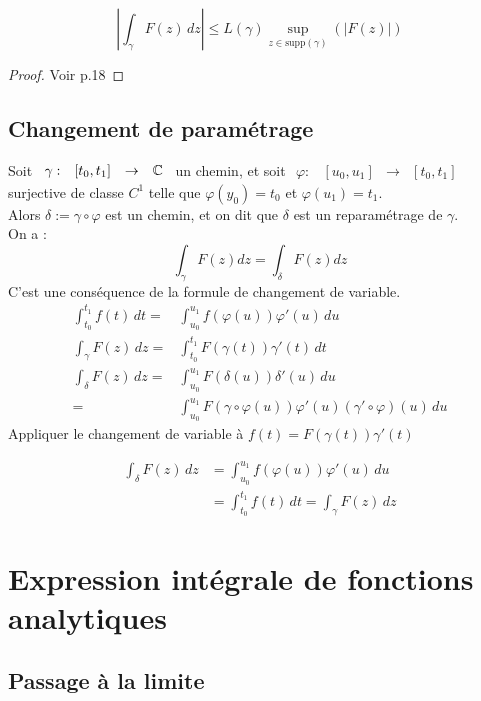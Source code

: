 \documentclass[]{report}
\begin{document}
\begin{lm}{}{}
    $$\left|\int_{\gamma} F(z) \,dz\right|\le L(\gamma)\underset{z\in\text{supp}(\gamma)}{\sup}(|F(z)|)$$
\end{lm}

\begin{proof}{}{}
    Voir p.18
\end{proof}

\subsection{Changement de paramétrage}

Soit $\begin{array}{ccccc}
\gamma : & [t_0,t_1] & \to & \mathbb{C}
\end{array}$ un chemin, et soit $\begin{array}{ccccc}
\varphi : & [u_0,u_1] & \to & [t_0,t_1]
\end{array}$ surjective de classe $C^1$ telle que $\varphi(y_0)=t_0$ et $\varphi(u_1)=t_1$. \\
Alors $\delta:=\gamma\circ\varphi$ est un chemin, et on dit que $\delta$ est un reparamétrage de $\gamma$.\\
On a : $$\int_\gamma F(z)dz=\int_\delta F(z)dz$$
C'est une conséquence de la formule de changement de variable.
\begin{align*}
\int_{t_0}^{t_1} f(t) \,dt = & \int_{u_0}^{u_1} f(\varphi(u))\varphi'(u)\,du\\
\int_\gamma F(z)\,dz= & \int_{t_0}^{t_1} F(\gamma(t))\gamma'(t)\,dt \\
\int_{\delta} F(z) \,dz=& \int_{u_0}^{u_1} F(\delta(u))\delta'(u)\,du\\
=& \int_{u_0}^{u_1} F(\gamma\circ\varphi(u))\varphi'(u)(\gamma'\circ\varphi)(u)\,du
\end{align*}
Appliquer le changement de variable à $f(t)=F(\gamma(t))\gamma'(t)$

\begin{align*}
     \int_{\delta} F(z)\,dz & = \int_{u_0}^{u_1} f(\varphi(u))\varphi'(u)\,du\\
    & =\int_{t_0}^{t_1}f(t)\,dt=\int_\gamma F(z)\,dz
\end{align*}

\section{Expression intégrale de fonctions analytiques}

\subsection{Passage à la limite}
\end{document}
